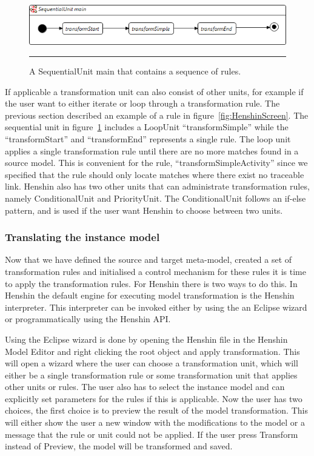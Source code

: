 \begin{figure}[H]
	\centering
	\includegraphics[scale=0.7]{figures/SequentialUnitHenshin_1.png}
	\rule{35em}{0.5pt}
	\caption[A Sequential Unit in Henshin]
	{A SequentialUnit main that contains a sequence of rules.}
	\label{fig:SequentialUnitHenshin}
\end{figure}

If applicable a transformation unit can also consist of other units, for example
if the user want to either iterate or loop through a transformation rule. The
previous section described an example of a rule in
figure~\ref{fig:HenshinScreen}. The sequential unit in
figure~\ref{fig:SequentialUnitHenshin} includes a LoopUnit
``transformSimple'' while the ``transformStart'' and ``transformEnd'' represents a
single rule. The loop unit applies a single transformation rule until there are
no more matches found in a source model.
This is convenient for the rule, ``transformSimpleActivity'' since we specified
that the rule should only locate matches where there exist no traceable link.
Henshin also has two other units that can administrate transformation rules,
namely ConditionalUnit and PriorityUnit. The ConditionalUnit follows an if-else
pattern, and is used if the user want Henshin to choose between two units.

\subsubsection*{Translating the instance model}

Now that we have defined the source and target meta-model, created a set of
transformation rules and initialised a control mechanism for these rules it is
time to apply the transformation rules. For Henshin there is two ways to do
this. In Henshin the default engine for executing model transformation is the
Henshin interpreter. This interpreter can be invoked either by using the an
Eclipse wizard or programmatically using the Henshin API. 

Using the Eclipse wizard is done by opening the Henshin file in the Henshin
Model Editor and right clicking the root object and apply transformation.
This will open a wizard where the user can choose a transformation unit, which
will either be a single transformation rule or some transformation unit that
applies other units or rules. The user also has to select the instance
model and can explicitly set parameters for the rules if this is applicable.
Now the user has two choices, the first choice is to preview the result of the
model transformation. This will either show the user a new window with the
modifications to the model or a message that the rule or unit could not be
applied. If the user press Transform instead of Preview, the model will be
transformed and saved.

